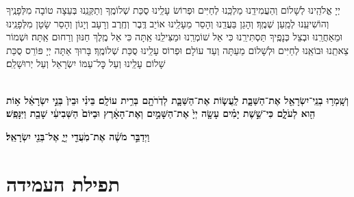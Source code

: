 \documentclass[twoside, openany, parskip=half, 11pt]{book}
\begin{document}
\hamaarivaravim

\ahavasolam

\shema

\veahavta

\vehaya

\vayomer{}

\emesveemuna

יְיָ אֱלֹהֵֽינוּ לְשָׁלוֹם וְהַעֲמִידֵֽנוּ מַלְכֵּֽנוּ לְחַיִּים וּפְרוֹשׂ עָלֵֽינוּ סֻכַּת שְׁלוֹמֶֽךָ וְתַקְּנֵֽנוּ בְּעֵצָה טוֹבָה מִלְּפָנֶֽיךָ וְהוֹשִׁיעֵֽנוּ לְמַֽעַן שְׁמֶֽךָ׃ וְהָגֵן בַּעֲדֵֽנוּ וְהָסֵר מֵעָלֵֽינוּ אוֹיֵב דֶּֽבֶר וְחֶֽרֶב וְרָעָב וְיָגוֹן וְהָסֵר שָׂטָן מִלְּפָנֵֽינוּ וּמֵאַחֲרֵֽנוּ וּבְצֵל כְּנָפֶֽיךָ תַּסְתִּירֵֽנוּ כִּי אֵל שׁוֹמְרֵֽנוּ וּמַצִּילֵֽנוּ אַֽתָּה כִּי אֵל מֶֽלֶךְ חַנּוּן וְרַחוּם אַֽתָּה׃ וּשְׁמוֹר צֵאתֵֽנוּ וּבוֹאֵֽנוּ לְחַיִּים וּלְשָׁלוֹם מֵעַתָּה וְעַד עוֹלָם׃ וּפְרוֹס עָלֵֽינוּ סֻכַּת שְׁלוֹמֶֽךָ׃ בָּרוּךְ אַתָּה יְיָ פּוֹרֵס סֻכַּת שָׁלוֹם עָלֵֽינוּ וְעַל כׇּל־עַמּוֹ יִשְׂרָאֵל וְעַל יְרוּשָׁלַ‍ִם׃

\\
\textbf{וְשָֽׁמְר֥וּ בְנֵֽי־יִשְׂרָאֵ֖ל אֶת־הַשַּׁבָּ֑ת
לַֽעֲשׂ֧וֹת אֶת־הַשַּׁבָּ֛ת לְדֹֽרֹתָ֖ם בְּרִ֥ית עוֹלָֽם׃ בֵּינִ֗י וּבֵין֙ בְּנֵ֣י יִשְׂרָאֵ֔ל א֥וֹת הִ֖וא לְעֹלָ֑ם כִּי־שֵׁ֣שֶׁת יָמִ֗ים עָשָׂ֤ה יְיָ֙
אֶת־הַשָּׁמַ֣יִם וְאֶת־הָאָ֔רֶץ וּבַיּוֹם֙ הַשְּׁבִיעִ֔י שָׁבַ֖ת וַיִּנָּפַֽשׁ׃
}

\textbf{
וַיְדַבֵּ֣ר מֹשֶׁ֔ה אֶת־מֹֽעֲדֵ֖י יְיָ֑ אֶל־בְּנֵ֖י יִשְׂרָאֵֽל׃
}



\halfkaddish

\section[תפילת העמידה]{ תפילת העמידה }

\newcommand{\shabbosshuva}{בשבת שובה׃}


\newcommand{\shabboskiddushhashem}{
\firstword{אַתָּה קָדוֹשׁ}
וְשִׁמְךָ קָדוֹשׁ וּקְדוֹשִׁים בְּכׇל־יוֹם יְהַלְלוּךָ סֶּֽלָה׃ בָּרוּךְ אַתָּה יְיָ *הָאֵל
(*\instruction{בשבת שובה:}
הַמֶּֽלֶךְ)
הַקָּדוֹשׁ׃
}


\newcommand{\shabboskiddushhayom}[1]{{
\firstword{אֱלֹהֵינוּ}
וֵאלֹהֵי אֲבוֹתֵינוּ רְצֵה בִמְנוּחָתֵנוּ קַדְּשֵׁנוּ בְּמִצְוֹתֶיךָ וְתֵן חֶלְקֵנוּ בְּתוֹרָתֶךָ שַׂבְּעֵנוּ מִטּוּבֶךָ וְשַׂמְּחֵנוּ בִּישׁוּעָתֶךָ וְטַהֵר לִבֵּנוּ לְעׇבְדְּךָ בֶּאֱמֶת׃ וְהַנְחִילֵנוּ יְיָ אֱלֹהֵינוּ בְּאַהֲבָה וּבְרָצוֹן שַׁבַּת קׇדְשֶׁךָ וְיָנוּחוּ בׇהּ#1 יִשְׂרָאֵל מְקַדְּשֵׁי שְׁמֶךָ׃
בָּרוּךְ אַתָּה יְיָ מְקַדֵּשׁ הַשַּׁבָּת׃
}}
\end{document}
